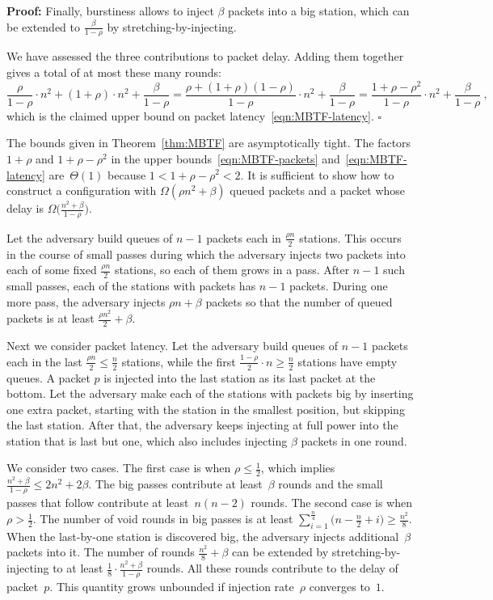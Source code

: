 \documentclass[11pt]{article}
\newcommand{\qed}{\hfill $\square$}
\newenvironment{proof}{\noindent\textbf{Proof: }}{\qed \smallbreak}
\begin{document}
\begin{proof}
Finally, burstiness allows to inject $\beta$ packets into a big station, which can be extended to $\frac{\beta}{1-\rho}$ by stretching-by-injecting.

We have assessed the three contributions to packet delay.
Adding them together gives a total of at most these many rounds:
\[
 \frac{\rho }{1-\rho} \cdot n^2 +  (1+\rho) \cdot n^2 +\frac{\beta}{1-\rho}
 =  
 \frac{\rho+(1+\rho)(1-\rho)}{1-\rho} \cdot  n^2 +\frac{\beta}{1-\rho}
=
\frac{1+\rho-\rho^2}{1-\rho} \cdot n^2+\frac{\beta}{1-\rho}
\ ,
\]
which is the claimed upper bound on packet latency~\eqref{eqn:MBTF-latency}. 
\end{proof}


The bounds given in Theorem~\ref{thm:MBTF} are asymptotically tight.
The factors $1+\rho$ and $1+\rho-\rho^2$ in the upper bounds~\eqref{eqn:MBTF-packets} and~\eqref{eqn:MBTF-latency} are~$\Theta(1)$ because $1<1+\rho-\rho^2< 2$.
It is sufficient to show how to construct a configuration with $\Omega(\rho n^2 +\beta)$ queued packets and a packet whose delay is  $\Omega\bigl(\frac{n^2 + \beta}{1-\rho}\bigr)$.

Let the adversary build queues of $n-1$ packets each in $\frac{\rho n }{2}$ stations.
This occurs in the course of small passes during which the adversary injects two packets into each of some fixed $\frac{\rho n }{2}$ stations, so each of them grows in a pass.
After $n-1$ such small passes, each of the stations with packets has $n-1$ packets.
During one more pass, the adversary injects $\rho n + \beta$ packets so that the number of queued packets is at least $\frac{\rho n^2 }{2} +\beta$.

Next we consider packet latency.
Let the adversary build queues of $n-1$ packets each in the last  $\frac{\rho n}{2}\le \frac{n}{2}$ stations, while the first $\frac{1-\rho }{2} \cdot n\ge \frac{n}{2}$ stations have empty queues.
A packet $p$ is injected into the last station as its last packet at the bottom.
Let the adversary make each of the stations with packets big by inserting one extra packet, starting with the station in the smallest position, but skipping the last station.
After that, the adversary keeps injecting at full power into the station that is last but one, which also includes  injecting $\beta$ packets in one round.

We consider two cases.
The first case is when $\rho\le \frac{1}{2}$, which implies $\frac{n^2 +\beta}{1-\rho}\le 2 n^2 + 2\beta$.
The big passes contribute at least~$\beta$ rounds and the small passes that follow contribute at least~$n(n-2)$ rounds.
The second case is when $\rho > \frac{1}{2}$.
The number of void rounds in big passes is at least  
$\sum_{i=1}^{\frac{n}{4}} \bigl(n-\frac{n}{2} +i\bigr) \ge \frac{n^2}{8}$.
When the last-by-one station is discovered big, the adversary injects additional~$\beta$  packets into it.
The number of rounds $\frac{n^2}{8}+\beta$ can be extended by stretching-by-injecting to at least $\frac{1}{8} \cdot \frac{n^2+\beta}{1-\rho}$ rounds.
All these rounds contribute to the delay of packet~$p$.
This quantity grows unbounded if injection rate~$\rho$ converges to~$1$.
\end{document}
